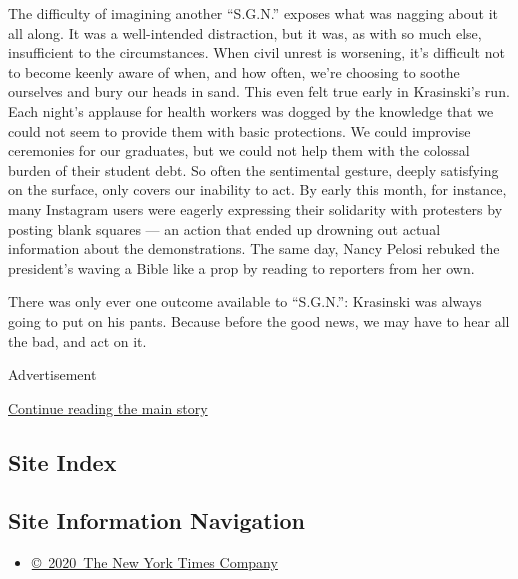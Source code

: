 The difficulty of imagining another ``S.G.N.'' exposes what was nagging
about it all along. It was a well-intended distraction, but it was, as
with so much else, insufficient to the circumstances. When civil unrest
is worsening, it's difficult not to become keenly aware of when, and how
often, we're choosing to soothe ourselves and bury our heads in sand.
This even felt true early in Krasinski's run. Each night's applause for
health workers was dogged by the knowledge that we could not seem to
provide them with basic protections. We could improvise ceremonies for
our graduates, but we could not help them with the colossal burden of
their student debt. So often the sentimental gesture, deeply satisfying
on the surface, only covers our inability to act. By early this month,
for instance, many Instagram users were eagerly expressing their
solidarity with protesters by posting blank squares --- an action that
ended up drowning out actual information about the demonstrations. The
same day, Nancy Pelosi rebuked the president's waving a Bible like a
prop by reading to reporters from her own.

There was only ever one outcome available to ``S.G.N.'': Krasinski was
always going to put on his pants. Because before the good news, we may
have to hear all the bad, and act on it.

Advertisement

\protect\hyperlink{after-bottom}{Continue reading the main story}

\hypertarget{site-index}{%
\subsection{Site Index}\label{site-index}}

\hypertarget{site-information-navigation}{%
\subsection{Site Information
Navigation}\label{site-information-navigation}}

\begin{itemize}
\tightlist
\item
  \href{https://help.nytimes3xbfgragh.onion/hc/en-us/articles/115014792127-Copyright-notice}{©~2020~The
  New York Times Company}
\end{itemize}


